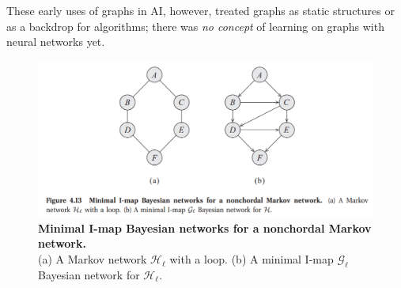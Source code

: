 \documentclass{article}
\begin{document}
These early uses of graphs in AI, however, treated graphs as static structures or as a backdrop for algorithms; there was \textit{no concept} of learning on graphs with neural networks yet.

\begin{figure}[h]
      \centering
      \includegraphics[width=1\textwidth,trim=0 100 0 0,clip]{../assets/bayesian-and-markov-networks.png}
      \caption{\textbf{Minimal I-map Bayesian networks for a nonchordal Markov network.} \\ (a) A Markov network $\mathcal{H}_\ell$ with a loop. (b) A minimal I-map $\mathcal{G}_\ell$ Bayesian network for $\mathcal{H}_\ell$.}
      \label{fig:bayesian-networks}
\end{figure}




\end{document}
